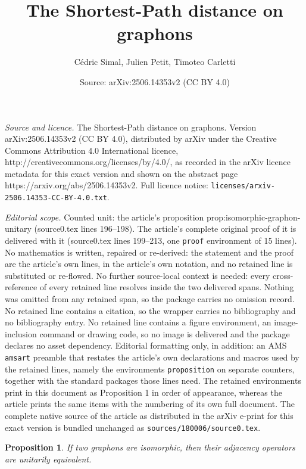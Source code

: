\documentclass[10pt,a4paper]{amsart}
\title{The Shortest-Path distance on graphons}
\author{C\'edric Simal, Julien Petit, Timoteo Carletti}
\date{Source: arXiv:2506.14353v2 (CC BY 4.0)}
\newtheorem{proposition}{Proposition}
\begin{document}
\maketitle

\noindent\emph{Source and licence.} The Shortest-Path distance on graphons. Version arXiv:2506.14353v2 (CC BY 4.0), distributed by arXiv under the Creative Commons Attribution 4.0 International licence, http://creativecommons.org/licenses/by/4.0/, as recorded in the arXiv licence metadata for this exact version and shown on the abstract page https://arxiv.org/abs/2506.14353v2. Full licence notice: \texttt{licenses/arxiv-2506.14353-CC-BY-4.0.txt}.\par\smallskip

\noindent\textit{Editorial scope.} Counted unit: the article's proposition prop:isomorphic-graphon-unitary (source0.tex lines 196--198). The article's complete original proof of it is delivered with it (source0.tex lines 199--213, one \texttt{proof} environment of 15 lines). No mathematics is written, repaired or re-derived: the statement and the proof are the article's own lines, in the article's own notation, and no retained line is substituted or re-flowed.  No further source-local context is needed: every cross-reference of every retained line resolves inside the two delivered spans.  Nothing was omitted from any retained span, so the package carries no omission record.  No retained line contains a citation, so the wrapper carries no bibliography and no bibliography entry.  No retained line contains a figure environment, an image-inclusion command or drawing code, so no image is delivered and the package declares no asset dependency.  Editorial formatting only, in addition: an AMS \texttt{amsart} preamble that restates the article's own declarations and macros used by the retained lines, namely the environments \texttt{proposition} on separate counters, together with the standard packages those lines need.  The retained environments print in this document as Proposition 1 in order of appearance, whereas the article prints the same items with the numbering of its own full document.  The complete native source of the article as distributed in the arXiv e-print for this exact version is bundled unchanged as \texttt{sources/180006/source0.tex}.
\begin{proposition} \label{prop:isomorphic-graphon-unitary}
    If two graphons are isomorphic, then their adjacency operators are unitarily equivalent.
\end{proposition}
\end{document}
